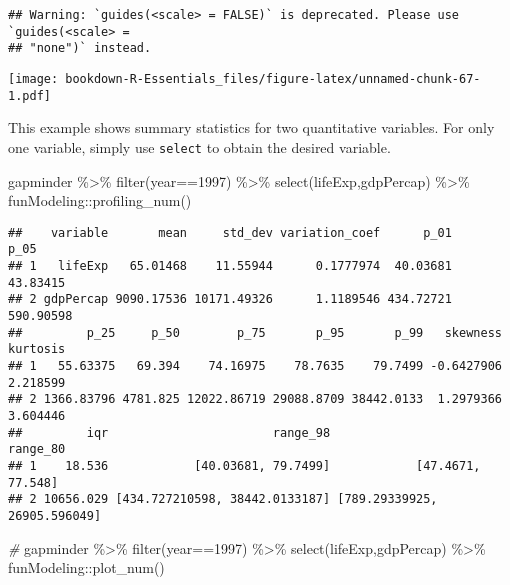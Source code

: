 \documentclass[
]{book}
\newenvironment{Shaded}{\begin{snugshade}}{\end{snugshade}}
\newcommand{\CommentTok}[1]{\textcolor[rgb]{0.56,0.35,0.01}{\textit{#1}}}
\newcommand{\DecValTok}[1]{\textcolor[rgb]{0.00,0.00,0.81}{#1}}
\newcommand{\FunctionTok}[1]{\textcolor[rgb]{0.00,0.00,0.00}{#1}}
\newcommand{\NormalTok}[1]{#1}
\newcommand{\SpecialCharTok}[1]{\textcolor[rgb]{0.00,0.00,0.00}{#1}}
\begin{document}
\begin{verbatim}
## Warning: `guides(<scale> = FALSE)` is deprecated. Please use `guides(<scale> =
## "none")` instead.
\end{verbatim}

\texttt{[image: bookdown-R-Essentials\_files/figure-latex/unnamed-chunk-67-1.pdf]}

This example shows summary statistics for two quantitative variables. For only one variable, simply use \texttt{select} to obtain the desired variable.

\begin{Shaded}
\begin{Highlighting}[]
\NormalTok{gapminder }\SpecialCharTok{\%\textgreater{}\%}
  \FunctionTok{filter}\NormalTok{(year}\SpecialCharTok{==}\DecValTok{1997}\NormalTok{) }\SpecialCharTok{\%\textgreater{}\%}
  \FunctionTok{select}\NormalTok{(lifeExp,gdpPercap) }\SpecialCharTok{\%\textgreater{}\%}
\NormalTok{funModeling}\SpecialCharTok{::}\FunctionTok{profiling\_num}\NormalTok{() }
\end{Highlighting}
\end{Shaded}

\begin{verbatim}
##    variable       mean     std_dev variation_coef      p_01      p_05
## 1   lifeExp   65.01468    11.55944      0.1777974  40.03681  43.83415
## 2 gdpPercap 9090.17536 10171.49326      1.1189546 434.72721 590.90598
##         p_25     p_50        p_75       p_95       p_99   skewness kurtosis
## 1   55.63375   69.394    74.16975    78.7635    79.7499 -0.6427906 2.218599
## 2 1366.83796 4781.825 12022.86719 29088.8709 38442.0133  1.2979366 3.604446
##         iqr                       range_98                     range_80
## 1    18.536            [40.03681, 79.7499]            [47.4671, 77.548]
## 2 10656.029 [434.727210598, 38442.0133187] [789.29339925, 26905.596049]
\end{verbatim}

\begin{Shaded}
\begin{Highlighting}[]
\CommentTok{\#}
\NormalTok{gapminder }\SpecialCharTok{\%\textgreater{}\%}
  \FunctionTok{filter}\NormalTok{(year}\SpecialCharTok{==}\DecValTok{1997}\NormalTok{) }\SpecialCharTok{\%\textgreater{}\%}
  \FunctionTok{select}\NormalTok{(lifeExp,gdpPercap) }\SpecialCharTok{\%\textgreater{}\%}
\NormalTok{funModeling}\SpecialCharTok{::}\FunctionTok{plot\_num}\NormalTok{() }
\end{Highlighting}
\end{Shaded}
\end{document}
